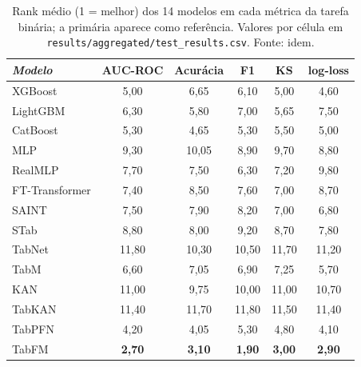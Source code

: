 \begin{table}[htbp]
\centering
\small
\caption[Métricas secundárias --- tarefa binária]{Rank médio (1 = melhor) dos 14 modelos em cada métrica da tarefa binária; a primária aparece como referência. Valores por célula em \texttt{results/\allowbreak aggregated/\allowbreak test\_\allowbreak results.\allowbreak csv}. Fonte: idem.}
\label{tab:app-secundarias-binary}
\begin{tabular}{lccccc}
\toprule
\emph{Modelo} & AUC-ROC & Acurácia & F1 & KS & log-loss \\
\midrule
XGBoost & 5{,}00 & 6{,}65 & 6{,}10 & 5{,}00 & 4{,}60 \\
LightGBM & 6{,}30 & 5{,}80 & 7{,}00 & 5{,}65 & 7{,}50 \\
CatBoost & 5{,}30 & 4{,}65 & 5{,}30 & 5{,}50 & 5{,}00 \\
MLP & 9{,}30 & 10{,}05 & 8{,}90 & 9{,}70 & 8{,}80 \\
RealMLP & 7{,}70 & 7{,}50 & 6{,}30 & 7{,}20 & 9{,}80 \\
FT-Transformer & 7{,}40 & 8{,}50 & 7{,}60 & 7{,}00 & 8{,}70 \\
SAINT & 7{,}50 & 7{,}90 & 8{,}20 & 7{,}00 & 6{,}80 \\
STab & 8{,}80 & 8{,}00 & 9{,}20 & 8{,}70 & 7{,}80 \\
TabNet & 11{,}80 & 10{,}30 & 10{,}50 & 11{,}70 & 11{,}20 \\
TabM & 6{,}60 & 7{,}05 & 6{,}90 & 7{,}25 & 5{,}70 \\
KAN & 11{,}00 & 9{,}75 & 10{,}00 & 11{,}00 & 10{,}70 \\
TabKAN & 11{,}40 & 11{,}70 & 11{,}80 & 11{,}50 & 11{,}40 \\
TabPFN & 4{,}20 & 4{,}05 & 5{,}30 & 4{,}80 & 4{,}10 \\
TabFM & \textbf{2{,}70} & \textbf{3{,}10} & \textbf{1{,}90} & \textbf{3{,}00} & \textbf{2{,}90} \\
\bottomrule
\end{tabular}
\end{table}

